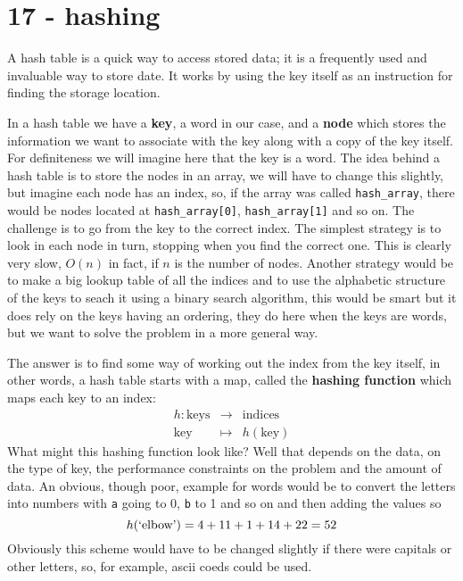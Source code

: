 \documentclass[11pt,a4paper]{scrartcl}
\begin{document}
\section*{17 - hashing}

A hash table is a quick way to access stored data; it is a frequently
used and invaluable way to store date. It works by using the key
itself as an instruction for finding the storage location.

In a hash table we have a \textbf{key}, a word in our case, and a
\textbf{node} which stores the information we want to associate with
the key along with a copy of the key itself. For definiteness we will
imagine here that the key is a word. The idea behind a hash table is
to store the nodes in an array, we will have to change this slightly,
but imagine each node has an index, so, if the array was called
\texttt{hash\_array}, there would be nodes located at
\texttt{hash\_array[0]}, \texttt{hash\_array[1]} and so on. The
challenge is to go from the key to the correct index. The simplest
strategy is to look in each node in turn, stopping when you find the
correct one. This is clearly very slow, $O(n)$ in fact, if $n$ is the
number of nodes. Another strategy would be to make a big lookup table
of all the indices and to use the alphabetic structure of the keys to
seach it using a binary search algorithm, this would be smart but it
does rely on the keys having an ordering, they do here when the keys
are words, but we want to solve the problem in a more general way.

The answer is to find some way of working out the index from the key
itself, in other words, a hash table starts with a map, called the
\textbf{hashing function} which maps each key to an index:
\begin{eqnarray}
h:\mbox{keys}&\rightarrow&\mbox{indices}\\
\mbox{key}&\mapsto&h(\mbox{key})
\end{eqnarray}
What might this hashing function look like? Well that depends on the
data, on the type of key, the performance constraints on the problem
and the amount of data. An obvious, though poor, example for words
would be to convert the letters into numbers with \texttt{a} going to
0, \texttt{b} to 1 and so on and then adding the values so
\begin{equation}
h(\mbox{\lq{}elbow\rq{}})=4+11+1+14+22=52
\end{equation}
Obviously this scheme would have to be changed slightly if there were
capitals or other letters, so, for example, ascii coeds could be used.
\end{document}
